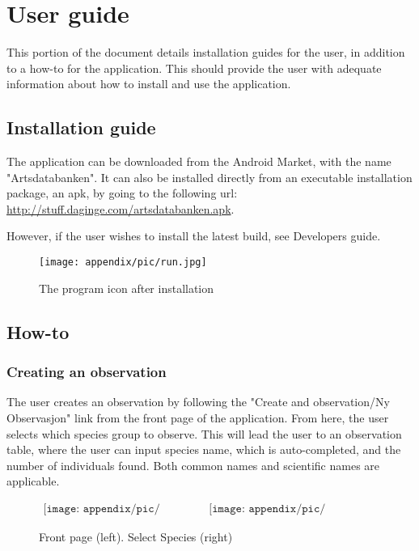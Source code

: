 \newpage
\section{User guide}
This portion of the document details installation guides for the user, in addition to a how-to for the application. This should provide the user with adequate information about how to install and use the application.
\subsection{Installation guide}
The application can be downloaded from the Android Market, with the name "Artsdatabanken". It can also be installed directly from an executable installation package, an apk, by going to the following url: \url{http://stuff.daginge.com/artsdatabanken.apk}.

However, if the user wishes to install the latest build, see Developers guide.

\begin{figure}[h!]
\centering
 \texttt{[image: appendix/pic/run.jpg]} 
 \caption{The program icon after installation}
 \end{figure}

\subsection{How-to}
\subsubsection{Creating an observation}
The user creates an observation by following the "Create and observation/Ny Observasjon" link from the front page of the application.
From here, the user selects which species group to observe. 
This will lead the user to an observation table, where the user can input species name, which is auto-completed, and the number of individuals found. 
Both common names and scientific names are applicable. 

\begin{figure}[h!]
\centering
 \begin{center}$
 \begin{array}{cc}
 \texttt{[image: appendix/pic/nyobs.jpg]} &
 \texttt{[image: appendix/pic/velgart.jpg]}
 \end{array}$
 \end{center}
 \caption{Front page (left). Select Species (right) }
 \end{figure}


